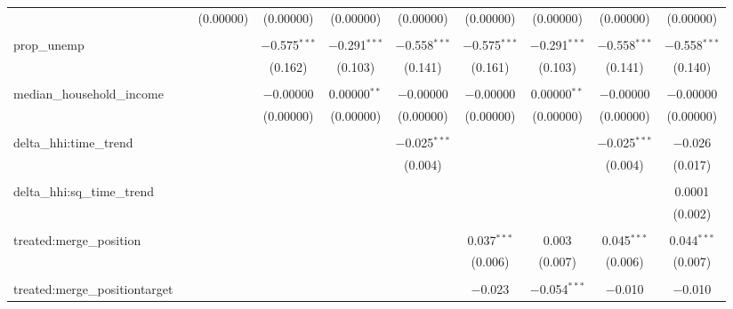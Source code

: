 \begin{table}[H]
{\begin{tabular}{@{\extracolsep{5pt}}lccccccccc}
   &  & (0.00000) & (0.00000) & (0.00000) & (0.00000) & (0.00000) & (0.00000) & (0.00000) & (0.00000) \\  

   & & & & & & & & & \\  

  prop\_unemp &  &  & $-$0.575$^{***}$ & $-$0.291$^{***}$ & $-$0.558$^{***}$ & $-$0.575$^{***}$ & $-$0.291$^{***}$ & $-$0.558$^{***}$ & $-$0.558$^{***}$ \\  

   &  &  & (0.162) & (0.103) & (0.141) & (0.161) & (0.103) & (0.141) & (0.140) \\  

   & & & & & & & & & \\  

  median\_household\_income &  &  & $-$0.00000 & 0.00000$^{**}$ & $-$0.00000 & $-$0.00000 & 0.00000$^{**}$ & $-$0.00000 & $-$0.00000 \\  

   &  &  & (0.00000) & (0.00000) & (0.00000) & (0.00000) & (0.00000) & (0.00000) & (0.00000) \\  

   & & & & & & & & & \\  

  delta\_hhi:time\_trend &  &  &  &  & $-$0.025$^{***}$ &  &  & $-$0.025$^{***}$ & $-$0.026 \\  

   &  &  &  &  & (0.004) &  &  & (0.004) & (0.017) \\  

   & & & & & & & & & \\  

  delta\_hhi:sq\_time\_trend &  &  &  &  &  &  &  &  & 0.0001 \\  

   &  &  &  &  &  &  &  &  & (0.002) \\  

   & & & & & & & & & \\  

  treated:merge\_position &  &  &  &  &  & 0.037$^{***}$ & 0.003 & 0.045$^{***}$ & 0.044$^{***}$ \\  

   &  &  &  &  &  & (0.006) & (0.007) & (0.006) & (0.007) \\  

   & & & & & & & & & \\  

  treated:merge\_positiontarget &  &  &  &  &  & $-$0.023 & $-$0.054$^{***}$ & $-$0.010 & $-$0.010 \\  


\end{tabular}}
\end{table}
